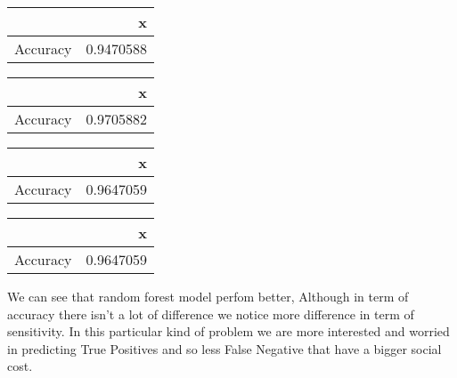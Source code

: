 \documentclass[]{article}
\begin{document}
\begin{table}

\centering
\begin{tabular}[t]{l|r}
\hline
  & x\\
\hline
Accuracy & 0.9470588\\
\hline
\end{tabular}
\centering
\begin{tabular}[t]{l|r}
\hline
  & x\\
\hline
Accuracy & 0.9705882\\
\hline
\end{tabular}
\centering
\begin{tabular}[t]{l|r}
\hline
  & x\\
\hline
Accuracy & 0.9647059\\
\hline
\end{tabular}
\centering
\begin{tabular}[t]{l|r}
\hline
  & x\\
\hline
Accuracy & 0.9647059\\
\hline
\end{tabular}
\end{table}

We can see that random forest model perfom better, Although in term of
accuracy there isn't a lot of difference we notice more difference in
term of sensitivity. In this particular kind of problem we are more
interested and worried in predicting True Positives and so less False
Negative that have a bigger social cost.
\end{document}
